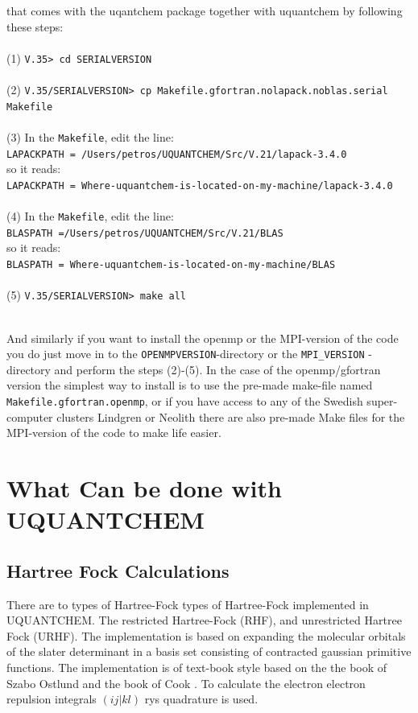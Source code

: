 \documentclass[a4paper,twoside,openany]{book}
\begin{document}
that comes with the uqantchem package together with uquantchem by following these steps: \\  \\
(1) \texttt{V.35> cd SERIALVERSION} \\ \\
(2)  \texttt{V.35/SERIALVERSION> cp Makefile.gfortran.nolapack.noblas.serial Makefile} \\ \\
\noindent
(3) In the \texttt{Makefile},  edit the line:\\ 
\indent
 \texttt{LAPACKPATH = /Users/petros/UQUANTCHEM/Src/V.21/lapack-3.4.0} \\
 \indent
 so it reads: \\
 \indent
 \texttt{LAPACKPATH = Where-uquantchem-is-located-on-my-machine/lapack-3.4.0} \\ \\
\noindent
(4) In the \texttt{Makefile},  edit the line:\\ 
\indent
 \texttt{BLASPATH =/Users/petros/UQUANTCHEM/Src/V.21/BLAS} \\
 \indent
 so it reads: \\
 \indent
 \texttt{BLASPATH = Where-uquantchem-is-located-on-my-machine/BLAS} \\ \\
\noindent
(5)  \texttt{V.35/SERIALVERSION>  make all} \\ \\
\noindent
\noindent

And similarly if you want to install the openmp or the MPI-version of  the code you do just move in to the  \texttt{OPENMPVERSION}-directory  or the \texttt{MPI\_VERSION}
-directory and perform the steps (2)-(5). In the case of the openmp/gfortran version the simplest way to install is to use the pre-made make-file named \texttt{Makefile.gfortran.openmp}, 
or if you have access to any of the Swedish super-computer clusters Lindgren or Neolith there are also pre-made Make files for the MPI-version of the code to make life 
easier.


\chapter{What Can be done with UQUANTCHEM}

\section{Hartree Fock Calculations}
There are to types of Hartree-Fock types of Hartree-Fock implemented in UQUANTCHEM. The restricted Hartree-Fock (RHF), and unrestricted Hartree Fock (URHF). 
The implementation is based on expanding the molecular orbitals of the slater determinant in a basis set consisting of contracted gaussian primitive functions.
The implementation is of text-book style based on the the book of Szabo Ostlund \cite{Szabo} and the book of Cook \cite{Cook}. To calculate the electron electron 
repulsion integrals $(ij|kl)$ rys quadrature is used.
\end{document}
